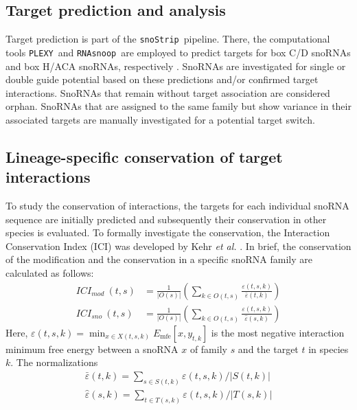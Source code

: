\documentclass[preprint,3p,times,twocolumn]{elsarticle}
\newcommand{\cd}{box C/D snoRNA}
\newcommand{\haca}{box H/ACA snoRNA}
\newcommand{\snostrip}{\texttt{snoStrip}}
\newcommand{\plexy}{\texttt{PLEXY}}
\newcommand{\snoop}{\texttt{RNAsnoop}}
\begin{document}
\subsection{Target prediction and analysis}

Target prediction is part of the \snostrip\ pipeline. There, the
computational tools \plexy\ and \snoop\ are employed to predict
targets for \cd s and \haca s, respectively \cite{Kehr:2011,
  Tafer:2010}.  SnoRNAs are investigated for single or double guide
potential based on these predictions and/or confirmed target
interactions. SnoRNAs that remain without target association are
considered orphan. SnoRNAs that are assigned to the same family but
show variance in their associated targets are manually investigated for
a potential target switch.

\subsection{Lineage-specific conservation of target interactions}
To study the conservation of interactions, the targets for each
individual snoRNA sequence are initially predicted and subsequently
their conservation in other species is evaluated. To formally
investigate the conservation, the Interaction Conservation Index (ICI)
was developed by Kehr \emph{et al.} \cite{Kehr:2014}. In brief, the
conservation of the modification and the conservation in a specific
snoRNA family are calculated as follows:
\begin{equation}
  \begin{split}
    ICI_{mod}\:(t,s) & = \frac{1}{|O(s)|} \left( \sum_{k\in O(t,s)} \frac{\varepsilon(t,s,k)}{\bar\varepsilon(t,k)} \right) \\
    ICI_{sno}\:(t,s) & = \frac{1}{|O(s)|} \left( \sum_{k\in O(t,s)} \frac{\varepsilon(t,s,k)}{\hat\varepsilon(s,k)} \right)
  \end{split}
\end{equation}
Here, $ \varepsilon(t,s,k) = \min_{x\in X(t,s,k)}
E_{\textrm{mfe}}[x,y_{t,k}] $ is the most negative interaction minimum free
energy between a snoRNA $x$ of family $s$ and the target $t$ in species
$k$. The normalizations 
\begin{equation}
\begin{split}
\bar\varepsilon(t,k)=\sum_{s\in
  S(t,k)}\varepsilon(t,s,k)/|S(t,k)| \\
 \hat\varepsilon(s,k)=\sum_{t\in
  T(s,k)}\varepsilon(t,s,k)/|T(s,k)|
\end{split}
\end{equation}
\end{document}
